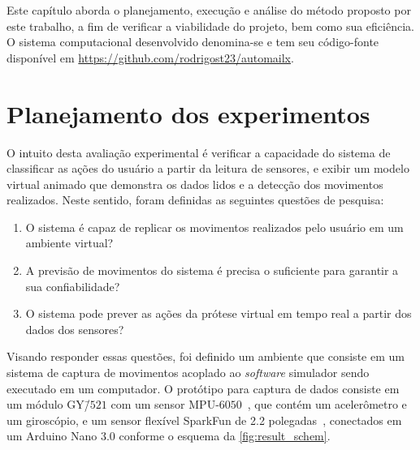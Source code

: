 Este capítulo aborda o planejamento, execução e análise do método proposto por este trabalho, a fim de verificar a viabilidade do projeto, bem como sua eficiência. O sistema computacional desenvolvido denomina-se \productname{} e tem seu código-fonte disponível em \url{https://github.com/rodrigost23/automailx}.

%
\section{Planejamento dos experimentos}\label{sec:result_planejamento}
%

O intuito desta avaliação experimental é verificar a capacidade do sistema \productname{} de classificar as ações do usuário a partir da leitura de sensores, e exibir um modelo virtual animado que demonstra os dados lidos e a detecção dos movimentos realizados. Neste sentido, foram definidas as seguintes questões de pesquisa:

\begin{enumerate}[label=\textbf{QP\arabic*:}, ref=QP\arabic*]
	\item O sistema \productname{} é capaz de replicar os movimentos realizados pelo usuário em um ambiente virtual?\label{qp:simula_movimentos}
	\item A previsão de movimentos do sistema \productname{} é precisa o suficiente para garantir a sua confiabilidade?\label{qp:acuracia}
	\item O sistema \productname{} pode prever as ações da prótese virtual em tempo real a partir dos dados dos sensores?\label{qp:previsao_sensores}
\end{enumerate}

Visando responder essas questões, foi definido um ambiente que consiste em um sistema de captura de movimentos acoplado ao \textit{software} simulador sendo executado em um computador.
% 
% 
O protótipo para captura de dados consiste em um módulo GY\=/\(521\) com um sensor MPU-\(6050\)~\cite{invensense:imu_mpu}, que contém um acelerômetro e um giroscópio, e um sensor flexível SparkFun de \num{2.2} polegadas~\cite{flex:datasheet}, conectados em um Arduino Nano 3.0 conforme o esquema da \autoref{fig:result_schem}.

